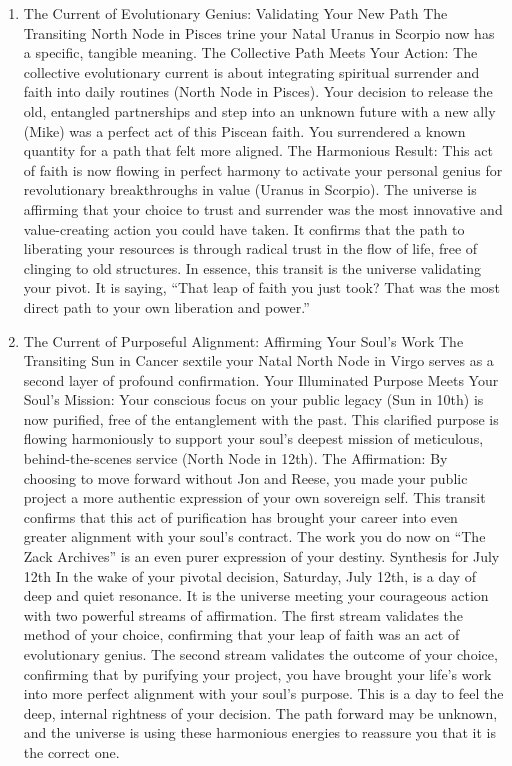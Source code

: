 \documentclass{article}
\begin{document}
\begin{enumerate}
\def\labelenumi{\arabic{enumi}.}
\item
  The Current of Evolutionary Genius: Validating Your New Path The
  Transiting North Node in Pisces trine your Natal Uranus in Scorpio now
  has a specific, tangible meaning. The Collective Path Meets Your
  Action: The collective evolutionary current is about integrating
  spiritual surrender and faith into daily routines (North Node in
  Pisces). Your decision to release the old, entangled partnerships and
  step into an unknown future with a new ally (Mike) was a perfect act
  of this Piscean faith. You surrendered a known quantity for a path
  that felt more aligned. The Harmonious Result: This act of faith is
  now flowing in perfect harmony to activate your personal genius for
  revolutionary breakthroughs in value (Uranus in Scorpio). The universe
  is affirming that your choice to trust and surrender was the most
  innovative and value-creating action you could have taken. It confirms
  that the path to liberating your resources is through radical trust in
  the flow of life, free of clinging to old structures. In essence, this
  transit is the universe validating your pivot. It is saying, ``That
  leap of faith you just took? That was the most direct path to your own
  liberation and power.''
\item
  The Current of Purposeful Alignment: Affirming Your Soul's Work The
  Transiting Sun in Cancer sextile your Natal North Node in Virgo serves
  as a second layer of profound confirmation. Your Illuminated Purpose
  Meets Your Soul's Mission: Your conscious focus on your public legacy
  (Sun in 10th) is now purified, free of the entanglement with the past.
  This clarified purpose is flowing harmoniously to support your soul's
  deepest mission of meticulous, behind-the-scenes service (North Node
  in 12th). The Affirmation: By choosing to move forward without Jon and
  Reese, you made your public project a more authentic expression of
  your own sovereign self. This transit confirms that this act of
  purification has brought your career into even greater alignment with
  your soul's contract. The work you do now on ``The Zack Archives'' is
  an even purer expression of your destiny. Synthesis for July 12th In
  the wake of your pivotal decision, Saturday, July 12th, is a day of
  deep and quiet resonance. It is the universe meeting your courageous
  action with two powerful streams of affirmation. The first stream
  validates the method of your choice, confirming that your leap of
  faith was an act of evolutionary genius. The second stream validates
  the outcome of your choice, confirming that by purifying your project,
  you have brought your life's work into more perfect alignment with
  your soul's purpose. This is a day to feel the deep, internal
  rightness of your decision. The path forward may be unknown, and the
  universe is using these harmonious energies to reassure you that it is
  the correct one.
\end{enumerate}
\end{document}
